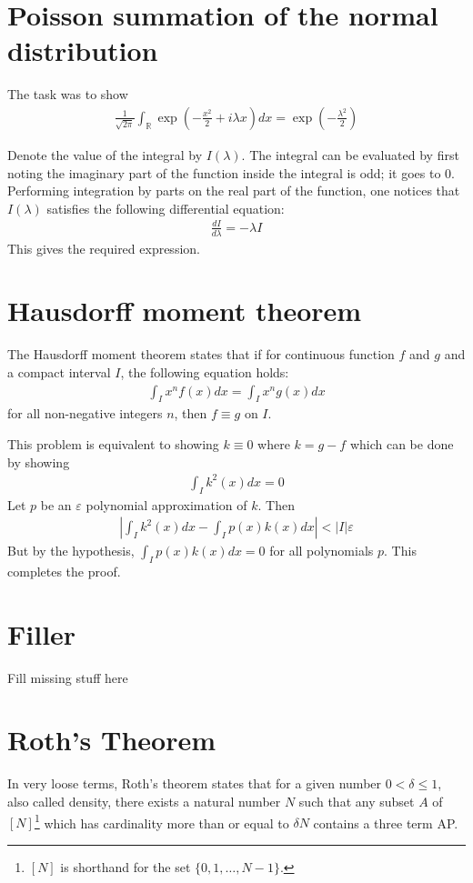 \documentclass{article}
\begin{document}
\section{Poisson summation of the normal distribution}
The task was to show
\begin{align*}
    \frac{1}{\sqrt{2\pi}} \int_{\mathbb{R}} \exp\left(-\frac{x^2}{2} + i\lambda x\right) dx = \exp\left( -\frac{\lambda^2}{2} \right)
\end{align*}

Denote the value of the integral by $I(\lambda)$. The integral can be evaluated by first noting the imaginary part of the function inside the integral is odd; it goes to $0$. Performing integration by parts on the real part of the function, one notices that $I(\lambda)$ satisfies the following differential equation:
\begin{align*}
    \frac{dI}{d\lambda} = -\lambda I
\end{align*}
This gives the required expression.

\section{Hausdorff moment theorem}
The Hausdorff moment theorem states that if for continuous function $f$ and $g$ and a compact interval $I$, the following equation holds:
\begin{align*}
    \int_{I}x^nf(x) dx = \int_{I}x^ng(x) dx
\end{align*}
for all non-negative integers $n$, then $f \equiv g$ on $I$.

This problem is equivalent to showing $k \equiv 0$ where $k =g-f$ which can be done by showing
\begin{align*}
    \int_{I}k^2(x) dx = 0
\end{align*}
Let $p$ be an $\varepsilon$ polynomial approximation of $k$. Then
\begin{align*}
    \left|\int_{I}k^2(x) dx - \int_{I}p(x) k(x) dx \right| < |I|\varepsilon
\end{align*}
But by the hypothesis, $\displaystyle \int_{I}p(x)k(x) dx = 0$ for all polynomials $p$. This completes the proof.

\section{Filler}
Fill missing stuff here

\section{Roth's Theorem}
In very loose terms, Roth's theorem states that for a given number $0 <\delta \leq 1$, also called density, there exists a natural number $N$ such that any subset $A$ of $[N]$\footnote{$[N]$ is shorthand for the set $\{0, 1, \ldots, N-1\}$.} which has cardinality more than or equal to $\delta N$ contains a three term AP.
\end{document}
